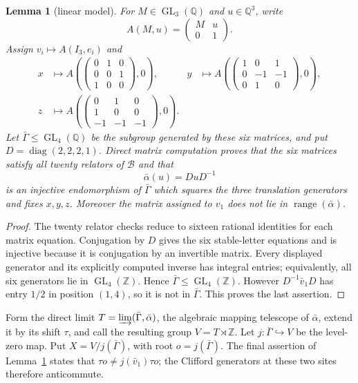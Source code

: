 \documentclass[11pt]{amsart}
\newcommand{\leanverified}[2]{\ignorespaces}
\newtheorem{lemma}[theorem]{Lemma}
\theoremstyle{definition}
\theoremstyle{remark}
\theoremstyle{plain}
\newcommand{\GL}{\operatorname{GL}}
\begin{document}
\begin{lemma}[linear model]\label{lem:linear}
For $M\in\GL_3(\mathbb Q)$ and $u\in\mathbb Q^3$, write
\[
 A(M,u)=\begin{pmatrix}M&u\\0&1\end{pmatrix}.
\]
Assign $v_i\mapsto A(I_3,e_i)$ and
\[
\begin{aligned}
 x&\mapsto A\!\left(\begin{pmatrix}0&1&0\\0&0&1\\1&0&0\end{pmatrix},0\right),
&y&\mapsto A\!\left(\begin{pmatrix}1&0&1\\0&-1&-1\\0&1&0\end{pmatrix},0\right),\\[3pt]
 z&\mapsto A\!\left(\begin{pmatrix}0&1&0\\1&0&0\\-1&-1&-1\end{pmatrix},0\right).
\end{aligned}
\]
Let $\bar\Gamma\le\GL_4(\mathbb Q)$ be the subgroup generated by these six
matrices, and put
$D=\operatorname{diag}(2,2,2,1)$.  Direct matrix computation proves that
the six matrices satisfy all twenty relators of $\mathcal B$ and that
\[
 \bar\alpha(u)=DuD^{-1}
\]
is an injective endomorphism of $\bar\Gamma$ which squares the three
translation generators and fixes $x,y,z$.  Moreover the matrix assigned to
$v_1$ does not lie in $\operatorname{range}(\bar\alpha)$.
\leanverified{Sofic/ManuscriptExactWrappers}{GroupApproximation.ManuscriptExactWrappers.manuscriptLinearModel}
\end{lemma}

\begin{proof}
The twenty relator checks reduce to sixteen rational identities for each
matrix equation.  Conjugation by $D$ gives the six stable-letter equations
and is injective because it is conjugation by an invertible matrix.  Every
displayed generator and its explicitly computed inverse has integral entries;
equivalently, all six generators lie in $\GL_4(\mathbb Z)$.  Hence
$\bar\Gamma\le\GL_4(\mathbb Z)$.  However $D^{-1}\bar v_1D$ has entry $1/2$
in position $(1,4)$, so it is not in $\bar\Gamma$.  This proves the last
assertion.
\end{proof}

Form the direct limit $T=\varinjlim(\bar\Gamma,\bar\alpha)$, the
algebraic mapping telescope of $\bar\alpha$, extend it by its shift
$\tau$, and call the resulting group $V=T\rtimes\mathbb Z$.  Let
$j\colon\bar\Gamma\hookrightarrow V$ be the level-zero map.  Put
$X=V/j(\bar\Gamma)$, with root $o=j(\bar\Gamma)$.  The final assertion of
Lemma~\ref{lem:linear} states that $\tau o\ne j(\bar v_1)\tau o$;
the Clifford generators at these two sites therefore anticommute.
\end{document}
